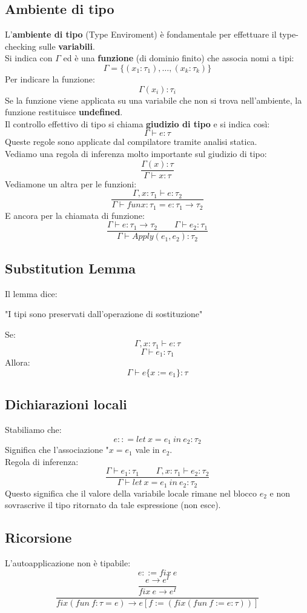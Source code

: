 \documentclass[12pt,a4paper]{article}
\begin{document}
\subsection{Ambiente di tipo}
L'\textbf{ambiente di tipo} (Type Enviroment) è fondamentale per effettuare il type-checking sulle \textbf{variabili}.\\
Si indica con $\Gamma$ ed è una \textbf{funzione} (di dominio finito) che associa nomi a tipi:
\[
\Gamma = \{(x_1: \tau_1),\ldots,(x_k: \tau_k)\}
\]
Per indicare la funzione:
\[
\Gamma(x_i): \tau_i
\]
Se la funzione viene applicata su una variabile che non si trova nell'ambiente, la funzione restituisce \textbf{undefined}.\\
Il controllo effettivo di tipo si chiama \textbf{giudizio di tipo} e si indica così:
\[
\Gamma \vdash e: \tau
\]
Queste regole sono applicate dal compilatore tramite analisi statica.\\
Vediamo una regola di inferenza molto importante sul giudizio di tipo:
\[
\frac{\Gamma(x): \tau}{\Gamma \vdash x: \tau}
\]
Vediamone un altra per le funzioni:
\[
\frac{\Gamma,x: \tau_1 \vdash e: \tau_2}{\Gamma \vdash fun x: \tau_1 = e: \tau_1 \rightarrow \tau_2}
\]
E ancora per la chiamata di funzione:
\[
\frac{\Gamma \vdash e:\tau_1 \rightarrow \tau_2 \text{ } \text{ } \text{ } \Gamma \vdash e_2:\tau_1}{\Gamma \vdash Apply(e_1,e_2):\tau_2}
\]
\subsection{Substitution Lemma}
Il lemma dice:
\begin{center}
  "I tipi sono preservati dall'operazione di sostituzione"
\end{center}
Se:
\[
\Gamma, x:\tau_1 \vdash e: \tau
\]
\[
\Gamma \vdash e_1:\tau_1
\]
Allora:
\[
\Gamma \vdash e\{x:=e_1\}: \tau
\]
\subsection{Dichiarazioni locali}
Stabiliamo che:
\[
e :: = let\ x = e_1\ in\ e_2: \tau_2
\]
Significa che l'associazione "$x = e_1$ vale in $e_2$.\\
Regola di inferenza:
\[
\frac{\Gamma \vdash e_1:\tau_1 \qquad \Gamma ,x:\tau_1 \vdash e_2:\tau_2}{\Gamma \vdash let\ x = e_1\ in\ e_2: \tau_2}
\]
Questo significa che il valore della variabile locale rimane nel blocco $e_2$ e non sovrascrive il tipo ritornato da tale espressione (non esce).
\subsection{Ricorsione}
L'autoapplicazione non è tipabile:
\[
e ::= fix\ e
\]
\[
\frac{e \rightarrow e^I}{fix\ e \rightarrow e^I}
\]
\[
\frac{}{fix(fun\ f:\tau = e) \rightarrow e[f:=(fix(fun\ f:=e:\tau))]}
\]
\end{document}
